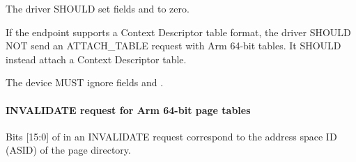 
The driver SHOULD set fields  and
 to zero.

If the endpoint supports a Context Descriptor table format, the
driver SHOULD NOT send an ATTACH_TABLE request with Arm 64-bit
tables. It SHOULD instead attach a Context Descriptor table.


The device MUST ignore fields  and
.

\paragraph{INVALIDATE request for Arm 64-bit page tables}\label{sec:Device Types / IOMMU Device / Table Formats / Arm64 / INVALIDATE}

Bits [15:0] of  in an INVALIDATE request correspond to
the address space ID (ASID) of the page directory.
